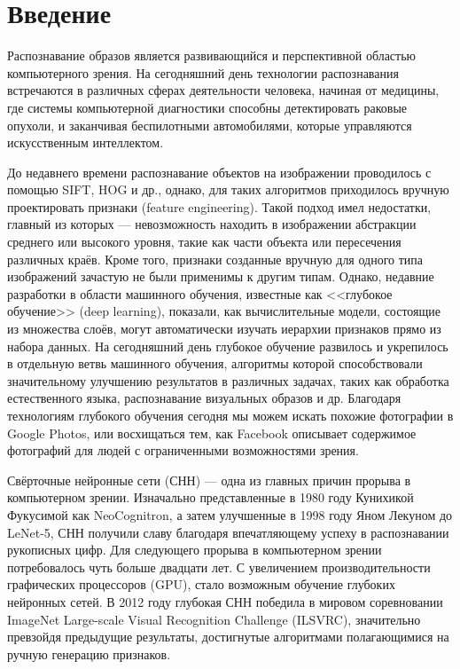 \section{Введение}
Распознавание образов является развивающийся и перспективной областью компьютерного зрения. На 
сегодняшний день технологии распознавания встречаются в различных сферах деятельности человека, 
начиная от медицины, где системы компьютерной диагностики способны детектировать раковые опухоли, и 
заканчивая беспилотными автомобилями, которые управляются искусственным интеллектом.

До недавнего времени распознавание объектов на изображении проводилось с помощью SIFT, HOG и др., 
однако, для таких алгоритмов приходилось вручную проектировать признаки (feature engineering). 
Такой подход имел недостатки, главный из которых --- невозможность находить в изображении 
абстракции среднего или высокого уровня, такие как части объекта или пересечения различных краёв. 
Кроме того, признаки созданные вручную для одного типа изображений зачастую не были применимы к 
другим типам. Однако, недавние разработки в области машинного обучения, известные как <<глубокое 
обучение>> (deep learning), показали, как вычислительные модели, состоящие из множества слоёв, 
могут автоматически изучать иерархии признаков прямо из набора данных.
На сегодняшний день глубокое обучение развилось и укрепилось в отдельную ветвь машинного обучения, 
алгоритмы которой способствовали значительному улучшению результатов в различных задачах, таких как 
обработка естественного языка, распознавание визуальных образов и др. Благодаря технологиям 
глубокого обучения сегодня мы можем искать похожие фотографии в Google Photos, или восхищаться тем, 
как Facebook описывает содержимое фотографий для людей с ограниченными возможностями зрения.

Свёрточные нейронные сети (СНН) --- одна из главных причин прорыва в компьютерном зрении. 
Изначально представленные в 1980 году Кунихикой Фукусимой как NeoCognitron, а затем улучшенные в 
1998 году Яном Лекуном до LeNet-5, СНН получили славу благодаря впечатляющему успеху в 
распознавании рукописных цифр. Для следующего прорыва в компьютерном зрении потребовалось чуть 
больше двадцати лет. С увеличением производительности графических процессоров (GPU), стало 
возможным обучение глубоких нейронных сетей. В 2012 году глубокая СНН победила в мировом 
соревновании ImageNet Large-scale Visual Recognition Challenge (ILSVRC), значительно превзойдя 
предыдущие результаты, достигнутые алгоритмами полагающимися на ручную генерацию признаков.